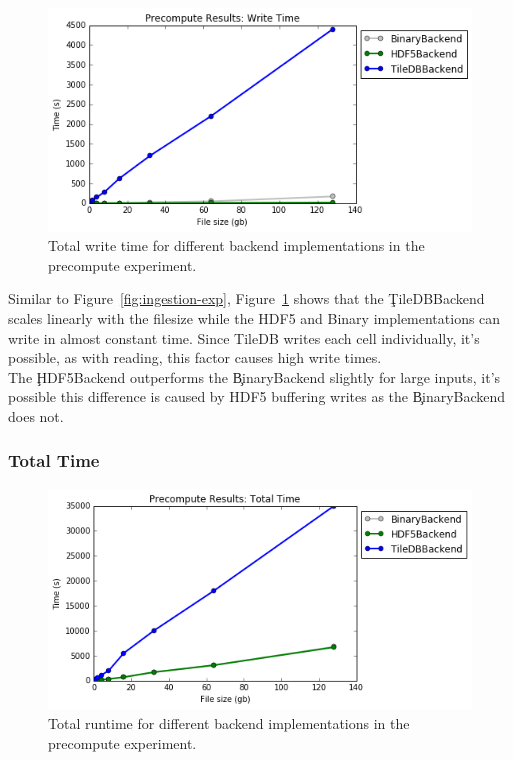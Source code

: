 \begin{figure}[h]
\begin{center}
\includegraphics[scale=0.75]{./img/precompute-exp-write-time.png}
\caption{Total write time for different backend implementations in the
  precompute experiment.}
\label{fig:precompute-exp-write-time}
\end{center}
\end{figure}

Similar to Figure~\ref{fig:ingestion-exp},
Figure~\ref{fig:precompute-exp-write-time} shows that the \c{TileDBBackend}
scales linearly with the filesize while the HDF5 and Binary implementations can
write in almost constant time. Since TileDB writes each cell individually, it's
possible, as with reading, this factor causes high write times. \\

The \c{HDF5Backend} outperforms the \c{BinaryBackend} slightly for large
inputs, it's possible this difference is caused by HDF5 buffering writes as
the \c{BinaryBackend} does not.

\subsubsection{Total Time}

\begin{figure}[h]
\begin{center}
\includegraphics[scale=0.75]{./img/precompute-exp-total-time.png}
\caption{Total runtime for different backend implementations in the precompute
  experiment.}
\label{fig:precompute-exp-total-time}
\end{center}
\end{figure}

